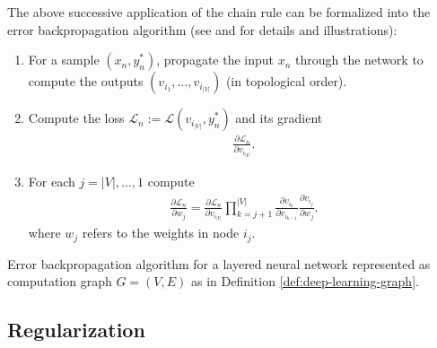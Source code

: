 The above successive application of the chain rule can be formalized into
the error backpropagation algorithm (see \cite[Section~4.8]{Bishop:1995}
and \cite[Section~6.5]{GoodfellowBengioCourville:2016} for details and
illustrations):

\begin{algorithm}[h]
  \small
  \begin{enumerate}[(1)]
    \item For a sample $(x_n ,y^*_n)$, propagate the input $x_n$ through the
    network to compute the outputs $(v_{i_1}, \ldots, v_{i_{|V|}})$ (in topological order).
    \vspace{-6px}
    \item Compute the loss $\mathcal{L}_n := \mathcal{L}(v_{i_{|V|}}, y_n^*)$
    and its gradient
    \begin{align}
      \frac{\partial \mathcal{L}_n}{\partial v_{i_{|V|}}}.
    \end{align}
    \vspace{-6px}
    \item For each $j = |V|,\ldots,1$ compute
    \begin{align}
      \frac{\partial \mathcal{L}_n}{\partial w_j} =
      \frac{\partial \mathcal{L}_n}{\partial v_{i_{|V|}}} \prod_{k = j + 1}^{|V|} \frac{\partial v_{i_k}}{\partial v_{i_{k - 1}}}
      \frac{\partial v_{i_j}}{\partial w_j}.
    \end{align}
    where $w_j$ refers to the weights in node $i_j$.
    \vspace{-12px}
  \end{enumerate}
  \caption{Error backpropagation algorithm for a layered neural network
  represented as computation graph $G = (V,E)$ as in
  Definition \ref{def:deep-learning-graph}.}
\end{algorithm}

\subsection{Regularization}

